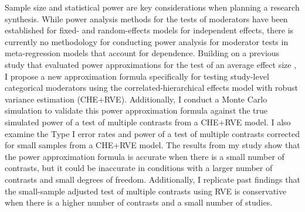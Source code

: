 

Sample size and statistical power are key considerations when planning a research synthesis. While power analysis methods for the tests of moderators have been established for fixed- and random-effects models for independent effects, there is currently no methodology for conducting power analysis for moderator tests in meta-regression models that account for dependence. Building on a previous study that evaluated power approximations for the test of an average effect size \autocite{vembye2023}, I propose a new approximation formula specifically for testing study-level categorical moderators using the correlated-hierarchical effects model with robust variance estimation (CHE+RVE). Additionally, I conduct a Monte Carlo simulation to validate this power approximation formula against the true simulated power of a test of multiple contrasts from a CHE+RVE model. I also examine the Type I error rates and power of a test of multiple contrasts corrected for small samples from a CHE+RVE model. The results from my study show that the power approximation formula is accurate when there is a small number of contrasts, but it could be inaccurate in conditions with a larger number of contrasts and small degrees of freedom. Additionally, I replicate past findings that the small-sample adjusted test of multiple contrasts using RVE is conservative when there is a higher number of contrasts and a small number of studies. 
